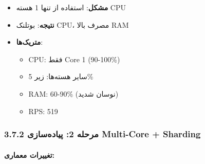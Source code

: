 \documentclass[
]{article}
\providecommand{\tightlist}{%
  \setlength{\itemsep}{0pt}\setlength{\parskip}{0pt}}
\begin{document}
\begin{itemize}
\tightlist
\item
  \textbf{مشکل}: استفاده از تنها 1 هسته CPU
\item
  \textbf{نتیجه}: بوتلنک CPU، مصرف بالا RAM
\item
  \textbf{متریک‌ها}:

  \begin{itemize}
  \tightlist
  \item
    CPU: فقط Core 1 (90-100\%)
  \item
    سایر هسته‌ها: زیر 5\%
  \item
    RAM: 60-90\% (نوسان شدید)
  \item
    RPS: 519
  \end{itemize}
\end{itemize}

\subsubsection{3.7.2 مرحله 2: پیاده‌سازی Multi-Core +
Sharding}\label{ux645ux631ux62dux644ux647-2-ux67eux6ccux627ux62fux647ux633ux627ux632ux6cc-multi-core-sharding}

\paragraph{تغییرات
معماری:}\label{ux62aux63aux6ccux6ccux631ux627ux62a-ux645ux639ux645ux627ux631ux6cc}
\end{document}
